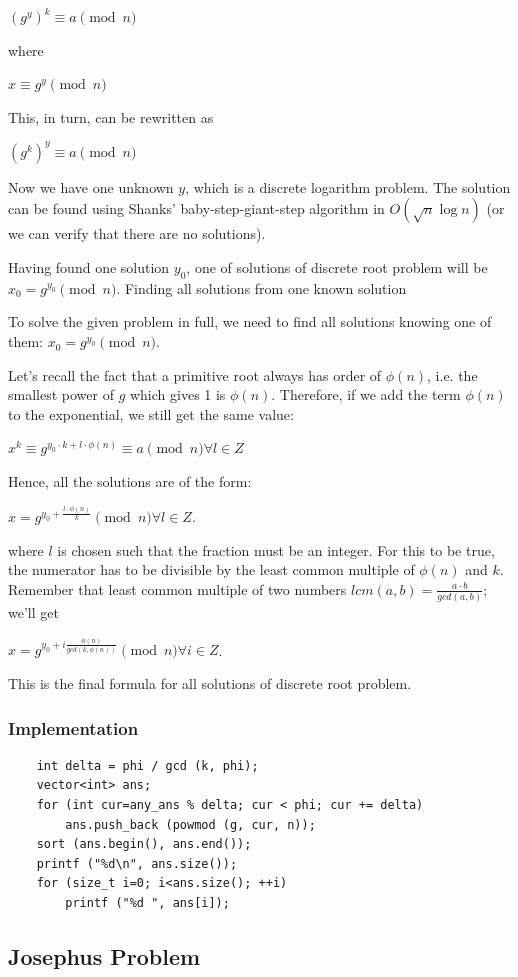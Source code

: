 \documentclass[8pt, a4paper, oneside, twocolumn]{extarticle}
\begin{document}
$(g^y)^k \equiv a \pmod n$

where

$x \equiv g^y \pmod n$

This, in turn, can be rewritten as

$(g^k)^y \equiv a \pmod n$

Now we have one unknown $y$, which is a discrete logarithm problem. The solution can be found using Shanks' baby-step-giant-step algorithm in $O(\sqrt {n} \log n)$ (or we can verify that there are no solutions).

Having found one solution $y_0$, one of solutions of discrete root problem will be $x_0 = g^{y_0} \pmod n$.
Finding all solutions from one known solution

To solve the given problem in full, we need to find all solutions knowing one of them: $x_0 = g^{y_0} \pmod n$.

Let's recall the fact that a primitive root always has order of $\phi (n)$, i.e. the smallest power of $g$ which gives 1 is $\phi (n)$. Therefore, if we add the term $\phi (n)$ to the exponential, we still get the same value:

$x^k \equiv g^{ y_0 \cdot k + l \cdot \phi (n)} \equiv a \pmod n \forall l \in Z$

Hence, all the solutions are of the form:

$x = g^{y_0 + \frac {l \cdot \phi (n)}{k}} \pmod n \forall l \in Z$.

where $l$ is chosen such that the fraction must be an integer. For this to be true, the numerator has to be divisible by the least common multiple of $\phi (n)$ and $k$. Remember that least common multiple of two numbers $lcm(a, b) = \frac{a \cdot b}{gcd(a, b)}$; we'll get

$x = g^{y_0 + i \frac {\phi (n)}{gcd(k, \phi (n))}} \pmod n \forall i \in Z$.

This is the final formula for all solutions of discrete root problem.
\subsubsection{Implementation}
\begin{verbatim}
    int delta = phi / gcd (k, phi);
	vector<int> ans;
	for (int cur=any_ans % delta; cur < phi; cur += delta)
		ans.push_back (powmod (g, cur, n));
	sort (ans.begin(), ans.end());
	printf ("%d\n", ans.size());
	for (size_t i=0; i<ans.size(); ++i)
		printf ("%d ", ans[i]);
\end{verbatim}
\subsection{Josephus Problem}
\end{document}
